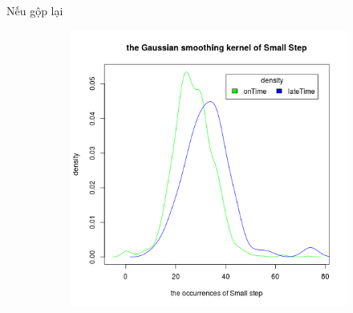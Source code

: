 \documentclass[a4paper, 13pt]{report}
\begin{document}
\FloatBarrier
Nếu gộp lại \\
\FloatBarrier
\begin{figure}[h]
    \begin{subfigure}[b]{0.7\textwidth}
        \includegraphics[width=\textwidth]{DensitySmallStep.png}
    \end{subfigure}
\end{figure}
\FloatBarrier
\end{document}
